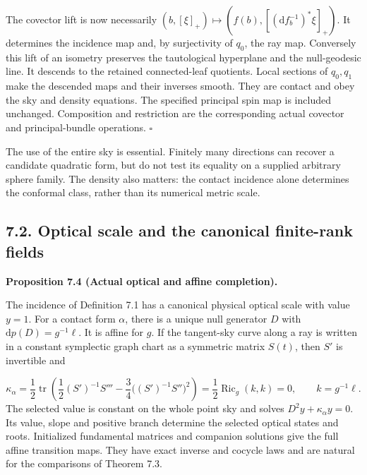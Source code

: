 \documentclass[
  english,
  11pt,
  reqno]{amsart}
\makeatletter
\newcommand{\pandocstatementheading}[1]{%
  \par\addpenalty{\@beginparpenalty}%
  \addvspace{.5\baselineskip plus .2\baselineskip minus .2\baselineskip}%
  {\normalfont\bfseries #1\par}%
  \nobreak\@afterindenttrue\@afterheading
}
\makeatother
\begin{document}
The covector lift is now necessarily
\((b,[\xi]_+)\mapsto(f(b),[(\mathrm df_b^{-1})^*\xi]_+)\). It determines
the incidence map and, by surjectivity of \(q_0\), the ray map.
Conversely this lift of an isometry preserves the tautological
hyperplane and the null-geodesic line. It descends to the retained
connected-leaf quotients. Local sections of \(q_0,q_1\) make the
descended maps and their inverses smooth. They are contact and obey the
sky and density equations. The specified principal spin map is included
unchanged. Composition and restriction are the corresponding actual
covector and principal-bundle operations. \hfill\(\square\)

The use of the entire sky is essential. Finitely many directions can
recover a candidate quadratic form, but do not test its equality on a
supplied arbitrary sphere family. The density also matters: the contact
incidence alone determines the conformal class, rather than its
numerical metric scale.

\subsection{7.2. Optical scale and the canonical finite-rank
fields}\label{optical-scale-and-the-canonical-finite-rank-fields}\label{sec:online-optical-and-finite-rank-fields}

\pandocstatementheading{\leavevmode{}\label{prop:online-canonical-optical-completion}Proposition 7.4 (Actual optical and affine completion).}

The incidence of Definition 7.1 has a canonical physical optical scale
with value \(y=1\). For a contact form \(\alpha\), there is a unique
null generator \(D\) with \(\mathrm dp(D)=g^{-1}\ell\). It is affine for
\(g\). If the tangent-sky curve along a ray is written in a constant
symplectic graph chart as a symmetric matrix \(S(t)\), then \(S'\) is
invertible and

\label{eq:online-canonical-optical-potential} \[
\kappa_\alpha
=\frac12\operatorname{tr}\left(
\frac12(S')^{-1}S'''-
\frac34\bigl((S')^{-1}S''\bigr)^2\right)
=\frac12\operatorname{Ric}_g(k,k)=0,
\qquad k=g^{-1}\ell.
\] The selected value is constant on the whole point sky and solves
\(D^2y+\kappa_\alpha y=0\). Its value, slope and positive branch
determine the selected optical states and roots. Initialized fundamental
matrices and companion solutions give the full affine transition maps.
They have exact inverse and cocycle laws and are natural for the
comparisons of Theorem 7.3.
\end{document}
